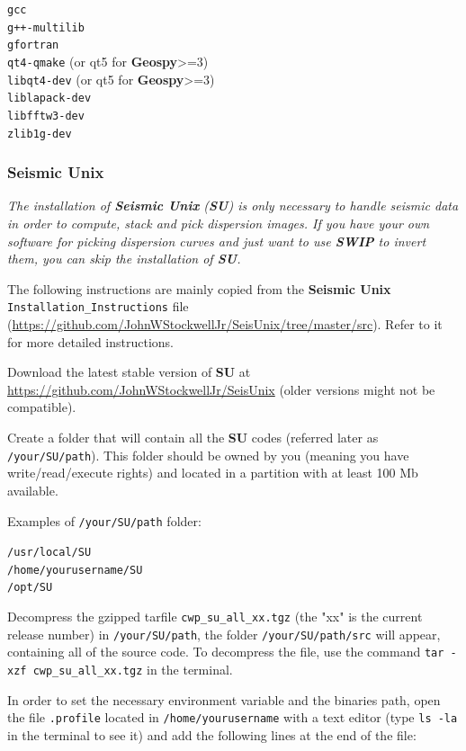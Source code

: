 \documentclass[twoside,a4paper]{article}
\def\SWIP{\textbf{SWIP}}
\def\SU{\textbf{SU}}
\def\SeismicUnix{\textbf{Seismic Unix}}
\def\Geopsy{\textbf{Geospy}}
\begin{document}
\verb|gcc|\\
\verb|g++-multilib|\\
\verb|gfortran|\\
\verb|qt4-qmake| (or qt5 for {\Geopsy}>=3)\\
\verb|libqt4-dev| (or qt5 for {\Geopsy}>=3)\\
\verb|liblapack-dev|\\
\verb|libfftw3-dev|\\
\verb|zlib1g-dev|

\subsubsection{Seismic Unix}
\textit{The installation of {\SeismicUnix} ({\SU}) is only necessary to handle seismic data in order to compute, stack and pick dispersion images. If you have your own software for picking dispersion curves and just want to use {\SWIP} to invert them, you can skip the installation of {\SU}.}

The following instructions are mainly copied from the {\SeismicUnix} \verb|Installation_Instructions| file (\url{https://github.com/JohnWStockwellJr/SeisUnix/tree/master/src}). Refer to it for more detailed instructions.

Download the latest stable version of {\SU} at \url{https://github.com/JohnWStockwellJr/SeisUnix} (older versions might not be compatible).

Create a folder that will contain all the {\SU} codes (referred later as \verb|/your/SU/path|). This folder should be owned by you (meaning you have write/read/execute rights) and located in a partition with at least 100 Mb available.

Examples of \verb|/your/SU/path| folder:

\verb|/usr/local/SU|\\
\verb|/home/yourusername/SU|\\
\verb|/opt/SU|

Decompress the gzipped tarfile \verb|cwp_su_all_xx.tgz| (the "xx" is the current release number) in \verb|/your/SU/path|, the folder \verb|/your/SU/path/src| will appear, containing all of the source code. To decompress the file, use the command \verb|tar -xzf cwp_su_all_xx.tgz| in the terminal.

In order to set the necessary environment variable and the binaries path, open the file \verb|.profile| located in \verb|/home/yourusername| with a text editor (type \verb|ls -la| in the terminal to see it) and add the following lines at the end of the file:
\end{document}
